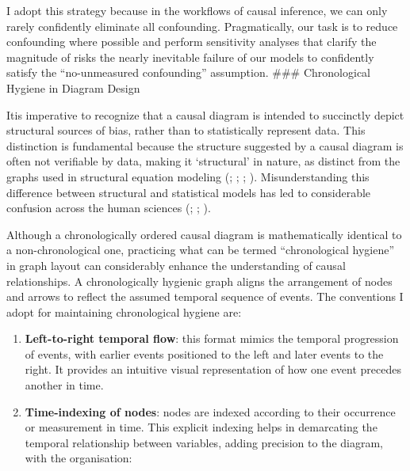 \documentclass[
  singlecolumn,
  9pt]{article}
\begin{document}
I adopt this strategy because in the workflows of causal inference, we
can only rarely confidently eliminate all confounding. Pragmatically,
our task is to reduce confounding where possible and perform sensitivity
analyses that clarify the magnitude of risks the nearly inevitable
failure of our models to confidently satisfy the ``no-unmeasured
confounding'' assumption. \#\#\# Chronological Hygiene in Diagram Design

Itis imperative to recognize that a causal diagram is intended to
succinctly depict structural sources of bias, rather than to
statistically represent data. This distinction is fundamental because
the structure suggested by a causal diagram is often not verifiable by
data, making it `structural' in nature, as distinct from the graphs used
in structural equation modeling (; ; ;
). Misunderstanding this
difference between structural and statistical models has led to
considerable confusion across the human sciences
(;
;
).

Although a chronologically ordered causal diagram is mathematically
identical to a non-chronological one, practicing what can be termed
``chronological hygiene'' in graph layout can considerably enhance the
understanding of causal relationships. A chronologically hygienic graph
aligns the arrangement of nodes and arrows to reflect the assumed
temporal sequence of events. The conventions I adopt for maintaining
chronological hygiene are:

\begin{enumerate}
\def\labelenumi{\arabic{enumi}.}
\item
  \textbf{Left-to-right temporal flow}: this format mimics the temporal
  progression of events, with earlier events positioned to the left and
  later events to the right. It provides an intuitive visual
  representation of how one event precedes another in time.
\item
  \textbf{Time-indexing of nodes}: nodes are indexed according to their
  occurrence or measurement in time. This explicit indexing helps in
  demarcating the temporal relationship between variables, adding
  precision to the diagram, with the organisation:
\end{enumerate}
\end{document}
